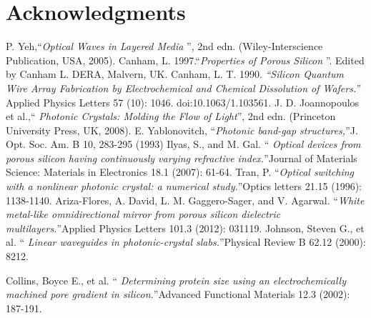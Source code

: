 \documentclass{article}
\begin{document}
\section{Acknowledgments}
%

\begin{thebibliography}{X}
 P. Yeh,\textquotedblleft \emph{Optical Waves in Layered
    Media} \textquotedblright, 2nd edn. (Wiley-Interscience
  Publication,
  USA, 2005).
Canham, L. 1997.\textquotedblleft \emph{Properties of
    Porous Silicon} \textquotedblright. Edited by Canham L. DERA,
  Malvern, UK.
Canham, L. T. 1990. \emph{\textquotedblleft Silicon
    Quantum Wire Array Fabrication by Electrochemical and Chemical
    Dissolution of Wafers.\textquotedblright} Applied Physics
  Letters 57 (10): 1046. doi:10.1063/1.103561.
 J. D. Joannopoulos et al.,\textquotedblleft
  \emph{Photonic Crystals: Molding the Flow of
    Light}\textquotedblright, 2nd edn.
  (Princeton University Press, UK, 2008).
 E. Yablonovitch, \textquotedblleft \emph{Photonic
    band-gap structures,}\textquotedblright J. Opt. Soc. Am. B 10,
  283-295 (1993)
 Ilyas, S., and M. Gal.  \textquotedblleft \emph{
    Optical devices from porous silicon having continuously varying
    refractive index.}\textquotedblright Journal of Materials
  Science: Materials in Electronics 18.1 (2007): 61-64.
 Tran, P. \textquotedblleft \emph{Optical switching with
    a nonlinear photonic crystal: a numerical
    study.}\textquotedblright Optics letters 21.15 (1996):
  1138-1140.
 Ariza-Flores, A. David, L. M. Gaggero-Sager, and
  V. Agarwal. \textquotedblleft \emph{White metal-like
    omnidirectional mirror from porous silicon dielectric
    multilayers.}\textquotedblright Applied Physics Letters 101.3
  (2012): 031119.
 Johnson, Steven G., et al.  \textquotedblleft
  \emph{Linear waveguides in photonic-crystal
    slabs.}\textquotedblright Physical Review B 62.12 (2000): 8212.

Collins, Boyce E., et al. \textquotedblleft \emph{
    Determining protein size using an electrochemically machined
    pore gradient in silicon.}\textquotedblright Advanced Functional
  Materials 12.3 (2002): 187-191.


\end{thebibliography}
\end{document}
